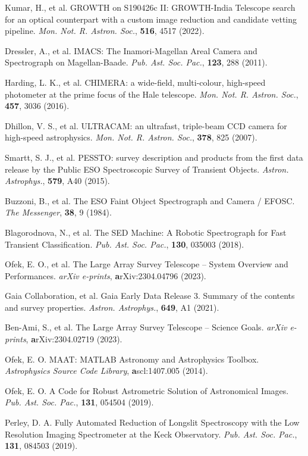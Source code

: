 \documentclass{nature_plusfigure}
\newcommand{\mn}{{Mon. Not. R. Astron. Soc.}}
\newcommand{\mnras}{\mn}
\newcommand{\aap}{{Astron. Astrophys.}}
\newcommand{\pasp}{{Pub. Ast. Soc. Pac.}}
\begin{document}
\begin{methods}
\begin{thebibliography}{10}
 Kumar, H., et al. GROWTH on S190426c II: GROWTH-India Telescope search for an optical counterpart with a custom image reduction and candidate vetting pipeline. \emph{\mnras}, \textbf{516}, 4517 (2022). 

 Dressler, A., et al. IMACS: The Inamori-Magellan Areal Camera and Spectrograph on Magellan-Baade. \emph{\pasp}, \textbf{123}, 288 (2011). 

 Harding, L. K., et al. CHIMERA: a wide-field, multi-colour, high-speed photometer at the prime focus of the Hale telescope. \emph{\mnras}, \textbf{457}, 3036 (2016). 

 Dhillon, V. S., et al. ULTRACAM: an ultrafast, triple-beam CCD camera for high-speed astrophysics. \emph{\mnras}, \textbf{378}, 825 (2007). 

  Smartt, S. J., et al. PESSTO: survey description and products from the first data release by the Public ESO Spectroscopic Survey of Transient Objects. \emph{\aap}, \textbf{579}, A40 (2015). 

 Buzzoni, B., et al. The ESO Faint Object Spectrograph and Camera / EFOSC. \emph{The Messenger}, \textbf{38}, 9 (1984). 

  Blagorodnova, N., et al. The SED Machine: A Robotic Spectrograph for Fast Transient Classification. \emph{\pasp}, \textbf{130}, 035003 (2018). 

  Ofek, E. O., et al. The Large Array Survey Telescope -- System Overview and Performances. \emph{arXiv e-prints}, \textbf arXiv:2304.04796 (2023). 
 
  Gaia Collaboration, et al. Gaia Early Data Release 3. Summary of the contents and survey properties. \emph{\aap}, \textbf{649}, A1 (2021). 

 Ben-Ami, S., et al. The Large Array Survey Telescope -- Science Goals. \emph{arXiv e-prints}, \textbf arXiv:2304.02719 (2023). 

 Ofek, E. O. MAAT: MATLAB Astronomy and Astrophysics Toolbox. \emph{Astrophysics Source Code Library}, \textbf ascl:1407.005 (2014). 

 Ofek, E. O. A Code for Robust Astrometric Solution of Astronomical Images. \emph{\pasp}, \textbf{131}, 054504 (2019). 

 Perley, D. A. Fully Automated Reduction of Longslit Spectroscopy with the Low Resolution Imaging Spectrometer at the Keck Observatory. \emph{\pasp}, \textbf{131}, 084503 (2019). 


\end{thebibliography}
\end{methods}
\end{document}
